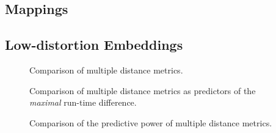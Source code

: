\subsection{Mappings}

\subsection{Low-distortion Embeddings}

\begin{figure}[h]
	\centering
	\caption{Comparison of multiple distance metrics.}
	\label{fig:metric_comparison}
\end{figure}

\begin{figure}[h]
	\centering
	\caption{Comparison of multiple distance metrics as predictors of the \emph{maximal} run-time difference.}
	\label{fig:metric_comparison_max}
\end{figure}

\begin{figure}[h]
	\centering
   \resizebox{0.75\textwidth}{!}{}
	\caption{Comparison of the predictive power of multiple distance metrics.}
	\label{fig:metric_regression}
\end{figure}